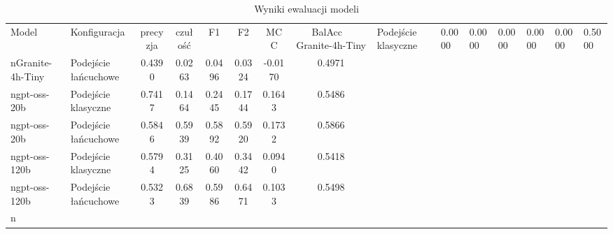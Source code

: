 \begin{table}[htbp]
\centering
\caption{Wyniki ewaluacji modeli}
\label{tab:wyniki}
\begin{tabular}{llcccccc}
\toprule
Model & Konfiguracja & precyzja & czułość & F1 & F2 & MCC & BalAcc \
\midrule
Granite-4h-Tiny & Podejście klasyczne & 0.0000 & 0.0000 & 0.0000 & 0.0000 & 0.0000 & 0.5000 \\nGranite-4h-Tiny & Podejście łańcuchowe & 0.4390 & 0.0263 & 0.0496 & 0.0324 & -0.0170 & 0.4971 \\ngpt-oss-20b & Podejście klasyczne & 0.7417 & 0.1464 & 0.2445 & 0.1744 & 0.1643 & 0.5486 \\ngpt-oss-20b & Podejście łańcuchowe & 0.5846 & 0.5939 & 0.5892 & 0.5920 & 0.1732 & 0.5866 \\ngpt-oss-120b & Podejście klasyczne & 0.5794 & 0.3125 & 0.4060 & 0.3442 & 0.0940 & 0.5418 \\ngpt-oss-120b & Podejście łańcuchowe & 0.5323 & 0.6839 & 0.5986 & 0.6471 & 0.1033 & 0.5498 \\n\bottomrule
\end{tabular}
\end{table}
